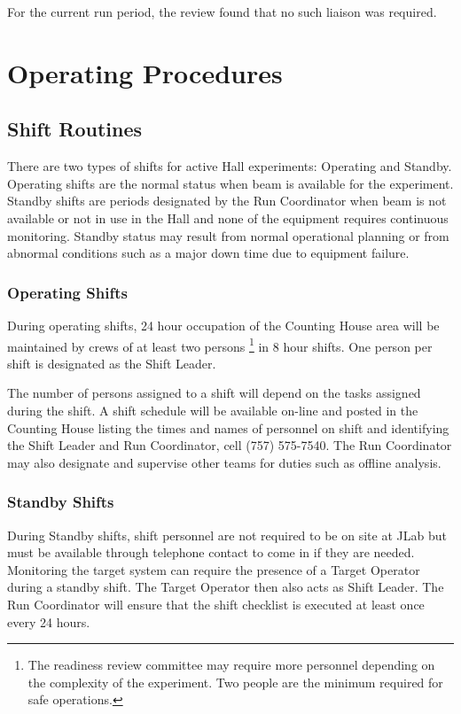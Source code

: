 \documentclass[11pt]{article}
\begin{document}
For the current run period, the review found that no such liaison was required. 


\section{Operating Procedures}

\subsection{Shift Routines}
\indent

There are two types of shifts for active Hall experiments:
Operating and Standby. Operating shifts are the normal status
when beam is available for the experiment. Standby shifts are periods 
designated by the Run Coordinator when beam is not available or not in
use in the Hall and none of the equipment requires
continuous monitoring. Standby status may result from normal operational
planning or from abnormal conditions such as a major down time due to
equipment failure.


\subsubsection{Operating Shifts}
\indent

During operating shifts, 24 hour occupation of the Counting House area will 
be maintained by crews of at least two persons
\footnote{\label{fn2}The readiness review committee may require more 
personnel depending on the complexity of the experiment. Two people are 
the minimum required for safe operations.} 
in 8 hour shifts. One person per shift is designated as the Shift Leader.

The number of persons assigned to a shift will depend on the tasks assigned 
during the shift. A shift schedule will be available on-line and posted in the Counting House 
listing the times and names of personnel on shift and identifying the 
Shift Leader and Run Coordinator, cell (757) 575-7540. The Run Coordinator may also designate 
and supervise other teams for duties such as offline analysis.

\subsubsection{Standby Shifts}
\indent

During Standby shifts, shift personnel are not required to be on site at 
JLab but must be available through telephone contact to come in if they
are needed.  Monitoring the target system can require the presence of a
Target Operator during a standby shift.  The Target Operator then also
acts as Shift Leader.  The Run Coordinator will ensure that the shift
checklist is executed at least once every 24 hours.
\end{document}
